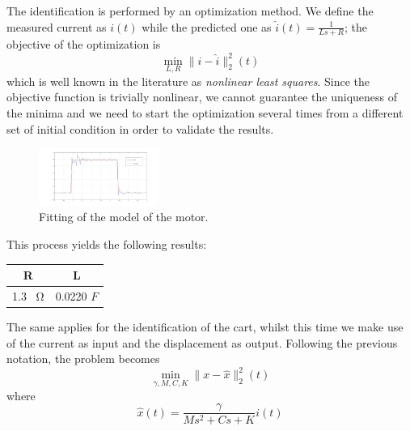 The identification is performed by an optimization method. We define the measured current as $i(t)$ while the predicted one as $\hat{i}(t) = \frac{1}{Ls+R}$; the objective of the optimization is
\begin{equation}
\min_{L,R} \|i-\hat{i}\|_2^2(t)
\end{equation}
which is well known in the literature as \emph{nonlinear least squares}. Since the objective function is trivially nonlinear, we cannot guarantee the uniqueness of the minima and we need to start the optimization several times from a different set of initial condition in order to validate the results.\\

\begin{figure}[h]
\centering
\includegraphics[width=0.35\textwidth]{img/graybox_motor.jpg}
\caption{Fitting of the model of the motor.}
\end{figure}

This process yields the following results:\\

\def\arraystretch{1.5}
\begin{table}[h]
\centering
\begin{tabular}{|c|c|}
	\hline
	R & L \\
	\hline
	1.3 \SI{}{\ohm}  & 0.0220 $F$ \\
	\hline
\end{tabular}
\end{table}

The same applies for the identification of the cart, whilst this time we make use of the current as input and the displacement as output. Following the previous notation, the problem becomes
\begin{equation}
\min_{\gamma,M,C,K} \|x-\hat{x}\|_2^2(t)
\end{equation}
where
\begin{equation}
\hat{x}(t) = \frac{\gamma}{Ms^2+Cs+K} i(t)
\end{equation}

